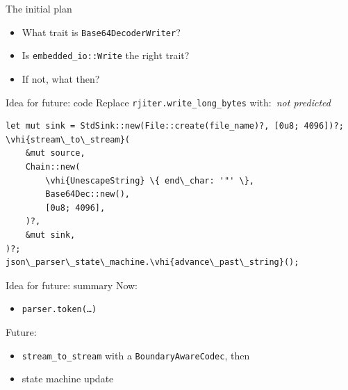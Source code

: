 \documentclass[aspectratio=169,11pt]{beamer}
\newcommand{\notetag}[1]{~\colorbox{orange!25}{\small\textit{#1}}}
\newcommand{\vhi}[1]{\mbox{\colorbox{yellow}{#1}}}
\begin{document}
\begin{frame}{The initial plan}
\begin{itemize}
\item What trait is \texttt{Base64DecoderWriter}?
\item Is \texttt{embedded\_io::Write} the right trait?
\item If not, what then?
\end{itemize}
\end{frame}

\begin{frame}[fragile]{Idea for future: code}
Replace \texttt{rjiter.write\_long\_bytes} with:\notetag{not predicted}
\begin{Verbatim}[fontsize=\small,frame=single,commandchars=\\\{\}]
let mut sink = StdSink::new(File::create(file_name)?, [0u8; 4096])?;
\vhi{stream\_to\_stream}(
    &mut source,
    Chain::new(
        \vhi{UnescapeString} \{ end\_char: '"' \},
        Base64Dec::new(),
        [0u8; 4096],
    )?,
    &mut sink,
)?;
json\_parser\_state\_machine.\vhi{advance\_past\_string}();
\end{Verbatim}
\end{frame}

\begin{frame}{Idea for future: summary}
Now:
\begin{itemize}
\item \texttt{parser.token(\dots)}
\end{itemize}

\medskip
Future:
\begin{itemize}
\item \texttt{stream\_to\_stream} with a \texttt{BoundaryAwareCodec}, then
\item state machine update
\end{itemize}
\end{frame}
\end{document}
